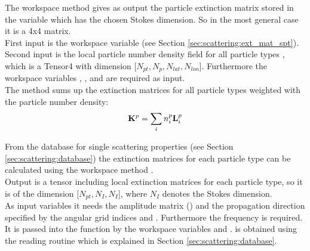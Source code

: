 The workspace method  gives as output the
particle extinction matrix  stored in the variable
 which has the chosen Stokes dimension. So in
the most general case it is a 4x4 matrix.\\
First input is the workspace variable  (see Section
\ref{sec:scattering:ext_mat_spt}). Second input is the
local particle number density field for all particle types
, which
 is a Tensor4 with dimension 
[$N_{pt}, N_{p}, N_{lat}, N_{lon}$]. Furthermore the  workspace
variables
, ,
 and  are
required as input. \\
The method sums up the extinction matrices for all particle types
weighted with the particle number density:
\begin{eqnarray}
  {\bf K}^{p} = \sum_i n^p_i {\bf L}^{p}_i 
\end{eqnarray}


\label{sec:scattering:ext_mat_gas}

\label{sec:scattering:ext_mat_spt}

From the database for single scattering properties (see Section 
\ref{sec:scattering:database}) the extinction matrices for each
particle type can be calculated using the workspace method
.\\
Output is a tensor including local extinction matrices for each
particle type, so it is of the dimension [$N_{pt}, N_{I}, N_{I}$],
where $N_{I}$ denotes the Stokes dimension.\\
As input variables it needs the amplitude matrix ()
and the propagation direction specified by the angular grid indices
 and . Furthermore the
frequency is required. It is passed into the function by the workspace
variables  and .
 is
obtained using the reading routine  which is
explained in Section \ref{sec:scattering:database}.


